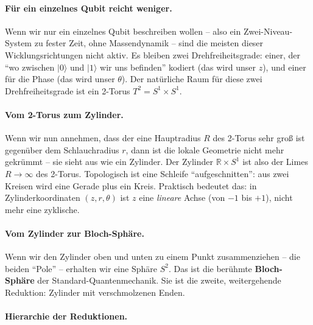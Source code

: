 \paragraph{Für ein einzelnes Qubit reicht weniger.}
Wenn wir nur ein einzelnes Qubit beschreiben wollen -- also ein
Zwei-Niveau-System zu fester Zeit, ohne Massendynamik -- sind die
meisten dieser Wicklungsrichtungen nicht aktiv. Es bleiben zwei
Drehfreiheitsgrade: einer, der \enquote{wo zwischen $|0\rangle$ und
$|1\rangle$ wir uns befinden} kodiert (das wird unser $z$), und einer
für die Phase (das wird unser $\theta$). Der natürliche Raum für
diese zwei Drehfreiheitsgrade ist ein 2-Torus $T^2 = S^1 \times S^1$.

\paragraph{Vom 2-Torus zum Zylinder.}
Wenn wir nun annehmen, dass der eine Hauptradius $R$ des 2-Torus
sehr groß ist gegenüber dem Schlauchradius $r$, dann ist die lokale
Geometrie nicht mehr gekrümmt -- sie sieht aus wie ein Zylinder.
Der Zylinder $\mathbb{R} \times S^1$ ist also der Limes
$R \to \infty$ des 2-Torus. Topologisch ist eine Schleife
\enquote{aufgeschnitten}: aus zwei Kreisen wird eine Gerade plus
ein Kreis. Praktisch bedeutet das: in Zylinderkoordinaten
$(z, r, \theta)$ ist $z$ eine \emph{lineare} Achse (von $-1$ bis
$+1$), nicht mehr eine zyklische.

\paragraph{Vom Zylinder zur Bloch-Sphäre.}
Wenn wir den Zylinder oben und unten zu einem Punkt zusammenziehen
-- die beiden \enquote{Pole} -- erhalten wir eine Sphäre $S^2$. Das
ist die berühmte \textbf{Bloch-Sphäre} der Standard-Quantenmechanik.
Sie ist die zweite, weitergehende Reduktion: Zylinder mit
verschmolzenen Enden.

\paragraph{Hierarchie der Reduktionen.}
\begin{center}
\renewcommand{\arraystretch}{1.4}
{\small
{}
}
\renewcommand{\arraystretch}{1.0}
\end{center}

